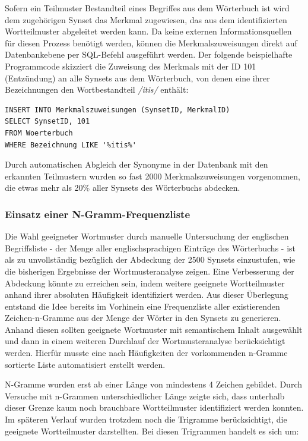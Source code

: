 \documentclass[pagesize,paper=A4,DIV=calc,fontsize=12pt,draft=false]{scrreprt}
\begin{document}
Sofern ein Teilmuster Bestandteil eines Begriffes aus dem Wörterbuch ist wird dem zugehörigen Synset das Merkmal zugewiesen, das aus dem identifizierten Wortteilmuster abgeleitet werden kann. 
Da keine externen Informationsquellen für diesen Prozess benötigt werden, können die Merkmalszuweisungen direkt auf Datenbankebene per SQL-Befehl ausgeführt werden. 
Der folgende beispielhafte Programmcode skizziert die Zuweisung des Merkmals mit der ID 101 (Entzündung) an alle Synsets aus dem Wörterbuch, von denen eine ihrer Bezeichnungen den Wortbestandteil \emph{/itis/} enthält: 

\lstset{
language=SQL
}

\begin{lstlisting}[caption={Merkmalszuweisung der ID 101 (Entzündung) an Synsets mit dem Wortbestandteil \emph{/itis/}}]
INSERT INTO Merkmalszuweisungen (SynsetID, MerkmalID) 
SELECT SynsetID, 101 
FROM Woerterbuch 
WHERE Bezeichnung LIKE '%itis%'
\end{lstlisting}

Durch automatischen Abgleich der Synonyme in der Datenbank mit den erkannten Teilmustern wurden so fast 2000 Merkmalszuweisungen vorgenommen, die etwas mehr als 20\% aller Synsets des Wörterbuchs abdecken. 

\subsubsection{Einsatz einer N-Gramm-Frequenzliste}

Die Wahl geeigneter Wortmuster durch manuelle Untersuchung der englischen Begriffsliste - der Menge aller englischsprachigen Einträge des Wörterbuchs - ist als zu unvollständig bezüglich der Abdeckung der 2500 Synsets einzustufen, wie die bisherigen Ergebnisse der Wortmusteranalyse zeigen. 
Eine Verbesserung der Abdeckung könnte zu erreichen sein, indem weitere geeignete Wortteilmuster anhand ihrer absoluten Häufigkeit identifiziert werden. 
Aus dieser Überlegung entstand die Idee bereits im Vorhinein eine Frequenzliste aller existierenden Zeichen-n-Gramme aus der Menge der Wörter in den Synsets zu generieren.
Anhand diesen sollten geeignete Wortmuster mit semantischem Inhalt ausgewählt und dann in einem weiteren Durchlauf der Wortmusteranalyse berücksichtigt werden. 
Hierfür musste eine nach Häufigkeiten der vorkommenden n-Gramme sortierte Liste automatisiert erstellt werden. 

N-Gramme wurden erst ab einer Länge von mindestens 4 Zeichen gebildet. 
Durch Versuche mit n-Grammen unterschiedlicher Länge zeigte sich, dass unterhalb dieser Grenze kaum noch brauchbare Wortteilmuster identifiziert werden konnten. 
Im späteren Verlauf wurden trotzdem noch die Trigramme berücksichtigt, die geeignete Wortteilmuster darstellten. 
Bei diesen Trigrammen handelt es sich um:
\end{document}
